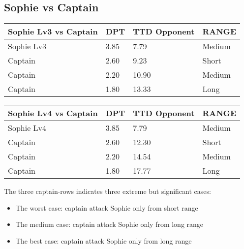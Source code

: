 \subsection{Sophie vs Captain}
\begin{table}[H]
  \centering
\begin{tabular}{|l|l|l|l|}
\hline
\rowcolor[HTML]{C0C0C0} 
\textbf{Sophie Lv3 vs Captain} & \textbf{DPT} & \textbf{TTD Opponent} & \textbf{RANGE} \\ \hline
Sophie Lv3 & 3.85 & 7.79 & Medium \\ \hline
Captain & 2.60 & 9.23 & Short \\ \hline
Captain & 2.20 & 10.90 & Medium \\ \hline
Captain & 1.80 & 13.33 & Long \\ \hline
\end{tabular}
\end{table}
\begin{table}[H]
  \centering
\begin{tabular}{|l|l|l|l|}
\hline
\rowcolor[HTML]{C0C0C0} 
\textbf{Sophie Lv4 vs Captain} & \textbf{DPT} & \textbf{TTD Opponent} & \textbf{RANGE} \\ \hline
Sophie Lv4 & 3.85 & 7.79 & Medium \\ \hline
Captain & 2.60 & 12.30 & Short \\ \hline
Captain & 2.20 & 14.54 & Medium \\ \hline
Captain & 1.80 & 17.77 & Long \\ \hline
\end{tabular}
\end{table}
The three captain-rows indicates three extreme but significant cases:
\begin{itemize}
\item The worst case: captain attack Sophie only from short range
\item The medium case: captain attack Sophie only  from long range
\item The best case: captain attack Sophie only  from long range
\end{itemize}

